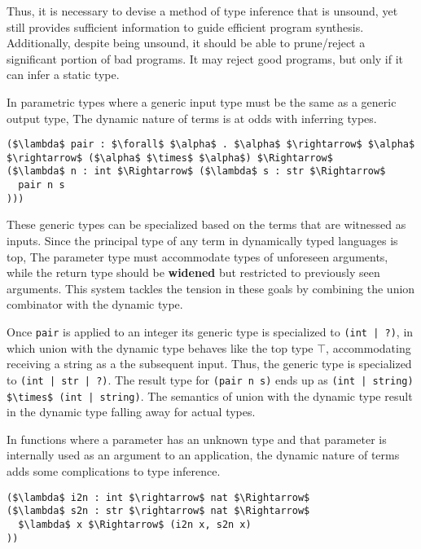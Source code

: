 \documentclass[sigplan,screen]{acmart}
\begin{document}
Thus, it is necessary to devise a method of type inference that is unsound, 
yet still provides sufficient information to guide efficient program synthesis.
Additionally, despite being unsound, it should be able to prune/reject 
a significant portion of bad programs. 
It may reject good programs, but only if it can infer a static type.

In parametric types where a generic input type must be the same as a generic output type,
The dynamic nature of terms is at odds with inferring types.

\begin{lstlisting}
($\lambda$ pair : $\forall$ $\alpha$ . $\alpha$ $\rightarrow$ $\alpha$ $\rightarrow$ ($\alpha$ $\times$ $\alpha$) $\Rightarrow$ 
($\lambda$ n : int $\Rightarrow$ ($\lambda$ s : str $\Rightarrow$ 
  pair n s
)))
\end{lstlisting}

\noindent These generic types can be specialized based on the terms that are witnessed as inputs. 
Since the principal type of any term in dynamically typed languages is top, 
The parameter type must accommodate types of unforeseen arguments, 
while the return type should be \textbf{widened} but restricted 
to previously seen arguments.
This system tackles the tension in these goals by combining the union combinator  
with the dynamic type. 

Once \lstinline{pair} is applied to an integer its generic type is specialized to 
\lstinline{(int | ?)}, 
in which union with the dynamic type behaves like the top type $\top$, 
accommodating receiving a string as a the subsequent input.
Thus, the generic type is specialized to \lstinline{(int | str | ?)}.
The result type for \lstinline{(pair n s)} ends up as 
\lstinline{(int | string) $\times$ (int | string)}. 
The semantics of union with the dynamic type result in the dynamic type 
falling away for actual types.

In functions where a parameter has an unknown type and that parameter is 
internally used as an argument to an application, the dynamic nature of terms  
adds some complications to type inference.

\begin{lstlisting}
($\lambda$ i2n : int $\rightarrow$ nat $\Rightarrow$ 
($\lambda$ s2n : str $\rightarrow$ nat $\Rightarrow$ 
  $\lambda$ x $\Rightarrow$ (i2n x, s2n x)
))

\end{lstlisting}
\end{document}
